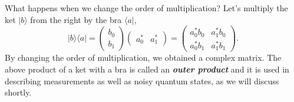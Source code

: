 What happens when we change the order of multiplication?
Let's multiply the ket $|b\rangle$ from the right by the bra $\langle a|$,
\begin{equation}
    | b\rangle \langle a | = \begin{pmatrix} b_0 \\ b_1 \end{pmatrix} \begin{pmatrix} a_0^* & a_1^* \end{pmatrix} = \begin{pmatrix} a_0^*b_0 & a_1^*b_0 \\ a_0^*b_1 & a_1^*b_1 \end{pmatrix}.
\end{equation}
By changing the order of multiplication, we obtained a complex matrix.
The above product of a ket with a bra is called an \textit{\textbf{outer product}}  and it is used in describing measurements as well as noisy quantum states, as we will discuss shortly.

